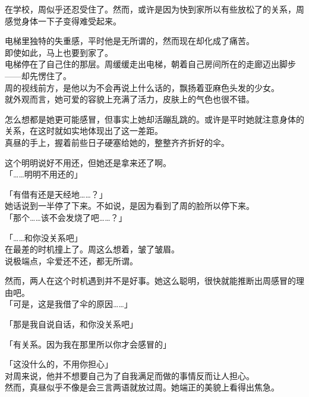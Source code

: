 在学校，周似乎还忍受住了。然而，或许是因为快到家所以有些放松了的关系，周感觉身体一下子变得难受起来。

电梯里独特的失重感，平时他是无所谓的，然而现在却化成了痛苦。\\

即使如此，马上也要到家了。\\

电梯停在了自己住的那层。周缓缓走出电梯，朝着自己房间所在的走廊迈出脚步——却先愣住了。\\

周的视线前方，是他以为不会再说上什么话的，飘扬着亚麻色头发的少女。\\

就外观而言，她可爱的容貌上充满了活力，皮肤上的气色也很不错。

怎么想都是她更可能感冒，但事实上她却活蹦乱跳的。或许是平时她就注意身体的关系，在这时就如实地体现出了这一差距。\\

真昼的手上，握着前些日子硬塞给她的，整整齐齐折好的伞。

这个明明说好不用还，但她还是拿来还了啊。\\

「……明明不用还的」

「有借有还是天经地……？」\\

她话说到一半停了下来。不如说，是因为看到了周的脸所以停下来。\\

「那个……该不会发烧了吧……？」

「……和你没关系吧」\\

在最差的时机撞上了。周这么想着，皱了皱眉。\\

说极端点，伞爱还不还，都无所谓。

然而，两人在这个时机遇到并不是好事。她这么聪明，很快就能推断出周感冒的理由吧。\\

「可是，这是我借了伞的原因……」

「那是我自说自话，和你没关系吧」

「有关系。因为我在那里所以你才会感冒的」

「这没什么的，不用你担心」\\

对周来说，他并不想要自己为了自我满足而做的事情反而让人担心。\\

然而，真昼似乎不像是会三言两语就放过周。她端正的美貌上看得出焦急。\\

